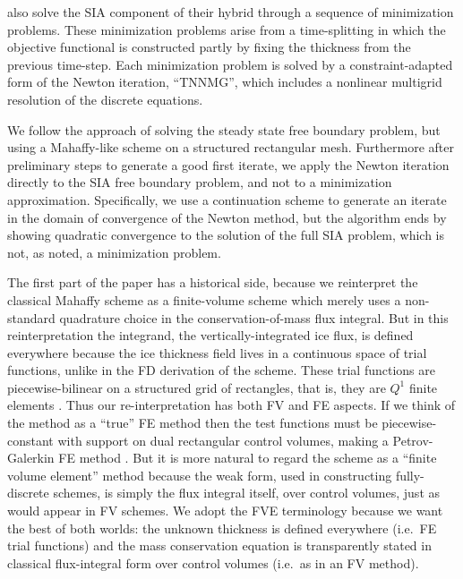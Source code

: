 \documentclass[twocolumn,letterpaper]{igs}
\begin{document}
\cite{JouvetGraeser2013} also solve the SIA component of their hybrid through a sequence of minimization problems.  These minimization problems arise from a time-splitting in which the objective functional is constructed partly by fixing the thickness from the previous time-step.  Each minimization problem is solved by a constraint-adapted form of the Newton iteration, ``TNNMG'', which includes a nonlinear multigrid resolution of the discrete equations.

We follow the \cite{JouvetBueler2012} approach of solving the steady state free boundary problem, but using a Mahaffy-like scheme on a structured rectangular mesh.  Furthermore after preliminary steps to generate a good first iterate, we apply the Newton iteration directly to the SIA free boundary problem, and not to a minimization approximation.  Specifically, we use a continuation scheme to generate an iterate in the domain of convergence of the Newton method, but the algorithm ends by showing quadratic convergence to the solution of the full SIA problem, which is not, as noted, a minimization problem.

The first part of the paper has a historical side, because we reinterpret the classical Mahaffy scheme as a finite-volume \citep[FV;][]{LeVeque2002} scheme which merely uses a non-standard quadrature choice in the conservation-of-mass flux integral.  But in this reinterpretation the integrand, the vertically-integrated ice flux, is defined everywhere because the ice thickness field lives in a continuous space of trial functions, unlike in the FD derivation of the scheme.  These trial functions are piecewise-bilinear on a structured grid of rectangles, that is, they are $Q^1$ finite elements \citep{Elmanetal2005}.  Thus our re-interpretation has both FV and FE aspects.  If we think of the method as a ``true'' FE method then the test functions must be piecewise-constant with support on dual rectangular control volumes, making a Petrov-Galerkin FE method \citep{Elmanetal2005}.  But it is more natural to regard the scheme as a ``finite volume element'' \citep[FVE;][]{Cai1990,EwingLinLin2002} method because the weak form, used in constructing fully-discrete schemes, is simply the flux integral itself, over control volumes, just as would appear in FV schemes.  We adopt the FVE terminology because we want the best of both worlds: the unknown thickness is defined everywhere (i.e.~FE trial functions) and the mass conservation equation is transparently stated in classical flux-integral form over control volumes (i.e.~as in an FV method).
\end{document}
